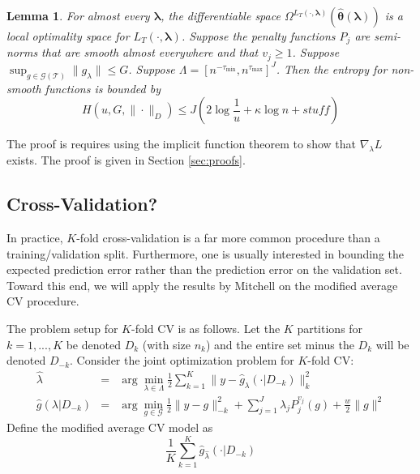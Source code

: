 \documentclass[12pt]{article}
\newtheorem{lemma}{Lemma}
\begin{document}
\begin{lemma}
For almost every $\boldsymbol{\lambda}$, the differentiable space $\Omega^{L_T(\cdot, \boldsymbol{\lambda})}(\hat{\boldsymbol \theta}\left(\boldsymbol{\lambda}\right))$ is a local optimality space for $L_T\left(\cdot,\boldsymbol{\lambda}\right)$. 
Suppose the penalty functions $P_j$ are semi-norms that are smooth almost everywhere and that $v_j \ge 1$. Suppose $\sup_{g \in \mathcal{G(T)}} \|g_\lambda\| \le G$. 
Suppose $\Lambda = [n^{- \tau_{\min}} , n^{\tau_{\max}}]^J$.
Then the entropy for non-smooth functions is bounded by 
\begin{equation}
H \left ( u, G, \| \cdot \|_D \right ) \le J \left ( 2 \log \frac{1}{u} + \kappa \log n + stuff \right )
\end{equation}
\end{lemma}

The proof is requires using the implicit function theorem to show that $\nabla_{\lambda} L$ exists. The proof is given in Section \ref{sec:proofs}.

\subsection{Cross-Validation?}

In practice, $K$-fold cross-validation is a far more common procedure than a training/validation split. Furthermore, one is usually interested in bounding the expected prediction error rather than the prediction error on the validation set. Toward this end, we will apply the results by Mitchell on the modified average CV procedure.

The problem setup for $K$-fold CV is as follows. Let the $K$ partitions for $k=1,...,K$ be denoted $D_k$ (with size $n_k$) and the entire set minus the $D_k$ will be denoted $D_{-k}$. Consider the joint optimization problem for $K$-fold CV:
\begin{eqnarray}
\label{kfold_opt}
\hat{\lambda} &=& \arg\min_{\lambda\in\Lambda} \frac{1}{2} \sum_{k=1}^K  \| y-\hat{g}_{\lambda}(\cdot| D_{-k}) \|_{k}^{2} \\
\hat{g}(\lambda | D_{-k})&=&\arg\min_{g\in\mathcal{G}} \frac{1}{2} \| y-g \|_{-k}^{2} + \sum_{j=1}^J \lambda_j P_j^{v_j}(g) + \frac{w}{2} \|g\|^2
\end{eqnarray}
Define the modified average CV model as
\begin{equation}
\frac{1}{K} \sum_{k=1}^K \hat{g}_{\hat \lambda}(\cdot | D_{-k})
\end{equation}
\end{document}
